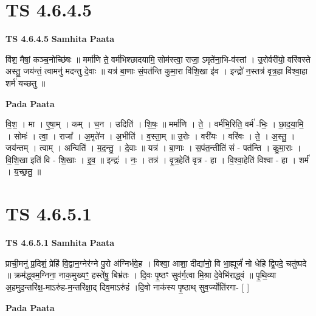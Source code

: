 \documentclass[17pt]{extarticle}
\begin{document}

\section{ TS 4.6.4.5 }

\textbf{TS 4.6.4.5 } \newline
\textbf{Samhita Paata} \newline

वि॑श॒ मैषां॒ कञ्च॒नोच्छि॑षः ॥ मर्मा॑णि ते॒ वर्म॑भिश्छादयामि॒ सोम॑स्त्वा॒ राजा॒ ऽमृते॑ना॒भि-व॑स्तां । उ॒रोर्वरी॑यो॒ वरि॑वस्ते अस्तु॒ जय॑न्तं॒ त्वामनु॑ मदन्तु दे॒वाः ॥ यत्र॑ बा॒णाः सं॒पत॑न्ति कुमा॒रा वि॑शि॒खा इ॑व । इन्द्रो॑ न॒स्तत्र॑ वृत्र॒हा वि॑श्वा॒हा शर्म॑ यच्छतु ॥ \newline

\textbf{Pada Paata} \newline

वि॒श॒ । मा । ए॒षा॒म् । कम् । च॒न । उदिति॑ । शि॒षः॒ ॥ मर्मा॑णि । ते॒ । वर्म॑भि॒रिति॒ वर्म॑ -भिः॒ । छा॒द॒या॒मि॒ । सोमः॑ । त्वा॒ । राजा᳚ । अ॒मृते॑न । अ॒भीति॑ । व॒स्ता॒म् ॥ उ॒रोः । वरी॑यः । वरि॑वः । ते॒ । अ॒स्तु॒ । जय॑न्तम् । त्वाम् । अन्विति॑ । म॒द॒न्तु॒ । दे॒वाः ॥ यत्र॑ । बा॒णाः । स॒पंत॒न्तीति॑ सं - पत॑न्ति । कु॒मा॒राः । वि॒शि॒खा इति॑ वि - शि॒खाः । इ॒व॒ ॥ इन्द्रः॑ । नः॒ । तत्र॑ । वृ॒त्र॒हेति॑ वृत्र - हा । वि॒श्वा॒हेति॑ विश्वा - हा । शर्म॑ । य॒च्छ॒तु॒ ॥  \newline





\section{ TS 4.6.5.1 }

\textbf{TS 4.6.5.1 } \newline
\textbf{Samhita Paata} \newline

प्राची॒मनु॑ प्र॒दिशं॒ प्रेहि॑ वि॒द्वान॒ग्नेर॑ग्ने पु॒रो अ॑ग्निर्भवे॒ह । विश्वा॒ आशा॒ दीद्या॑नो॒ वि भा॒ह्यूर्जं॑ नो धेहि द्वि॒पदे॒ चतु॑ष्पदे ॥ क्रम॑द्ध्वम॒ग्निना॒ नाक॒मुख्यꣳ॒॒ हस्ते॑षु॒ बिभ्र॑तः । दि॒वः पृ॒ष्ठꣳ सुव॑र्ग॒त्वा मि॒श्रा दे॒वेभि॑राद्ध्वं ॥ पृ॒थि॒व्या अ॒हमुद॒न्तरि॑क्ष॒-माऽरु॑ह-म॒न्तरि॑क्षा॒द् दिव॒माऽरु॑हं ।दि॒वो नाक॑स्य पृ॒ष्ठाथ् सुव॒र्ज्योति॑रगा- [  ] \newline

\textbf{Pada Paata} \newline
\end{document}
